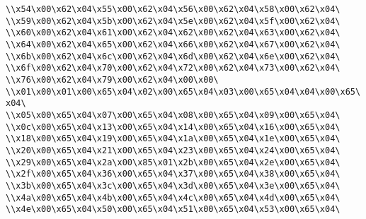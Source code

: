 \verb|\\x54\x00\x62\x04\x55\x00\x62\x04\x56\x00\x62\x04\x58\x00\x62\x04\|\newline
\verb|\\x59\x00\x62\x04\x5b\x00\x62\x04\x5e\x00\x62\x04\x5f\x00\x62\x04\|\newline
\verb|\\x60\x00\x62\x04\x61\x00\x62\x04\x62\x00\x62\x04\x63\x00\x62\x04\|\newline
\verb|\\x64\x00\x62\x04\x65\x00\x62\x04\x66\x00\x62\x04\x67\x00\x62\x04\|\newline
\verb|\\x6b\x00\x62\x04\x6c\x00\x62\x04\x6d\x00\x62\x04\x6e\x00\x62\x04\|\newline
\verb|\\x6f\x00\x62\x04\x70\x00\x62\x04\x72\x00\x62\x04\x73\x00\x62\x04\|\newline
\verb|\\x76\x00\x62\x04\x79\x00\x62\x04\x00\x00\|\newline
\verb|\\x01\x00\x01\x00\x65\x04\x02\x00\x65\x04\x03\x00\x65\x04\x04\x00\x65\x04\|\newline
\verb|\\x05\x00\x65\x04\x07\x00\x65\x04\x08\x00\x65\x04\x09\x00\x65\x04\|\newline
\verb|\\x0c\x00\x65\x04\x13\x00\x65\x04\x14\x00\x65\x04\x16\x00\x65\x04\|\newline
\verb|\\x18\x00\x65\x04\x19\x00\x65\x04\x1a\x00\x65\x04\x1e\x00\x65\x04\|\newline
\verb|\\x20\x00\x65\x04\x21\x00\x65\x04\x23\x00\x65\x04\x24\x00\x65\x04\|\newline
\verb|\\x29\x00\x65\x04\x2a\x00\x85\x01\x2b\x00\x65\x04\x2e\x00\x65\x04\|\newline
\verb|\\x2f\x00\x65\x04\x36\x00\x65\x04\x37\x00\x65\x04\x38\x00\x65\x04\|\newline
\verb|\\x3b\x00\x65\x04\x3c\x00\x65\x04\x3d\x00\x65\x04\x3e\x00\x65\x04\|\newline
\verb|\\x4a\x00\x65\x04\x4b\x00\x65\x04\x4c\x00\x65\x04\x4d\x00\x65\x04\|\newline
\verb|\\x4e\x00\x65\x04\x50\x00\x65\x04\x51\x00\x65\x04\x53\x00\x65\x04\|\newline
